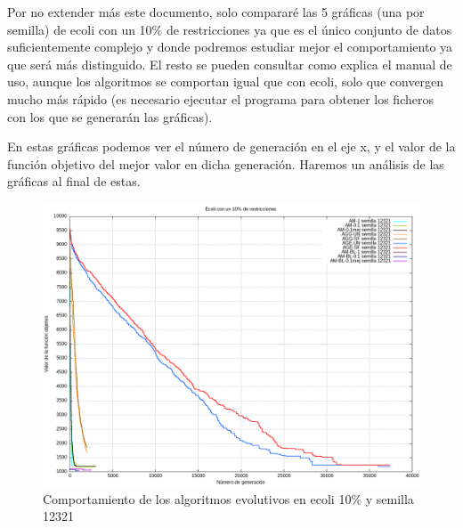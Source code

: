 \documentclass[12pt, spanish]{article}
\begin{document}
Por no extender más este documento, solo compararé las 5 gráficas (una por semilla) de ecoli con un 10\% de restricciones ya que es el único conjunto de datos suficientemente complejo y donde podremos estudiar mejor el comportamiento ya que será más distinguido. El resto se pueden consultar como explica el manual de uso, aunque los algoritmos se comportan igual que con ecoli, solo que convergen mucho más rápido (es necesario ejecutar el programa para obtener los ficheros con los que se generarán las gráficas).

En estas gráficas podemos ver el número de generación en el eje x, y el valor de la función objetivo del mejor valor en dicha generación. Haremos un análisis de las gráficas al final de estas.

\begin{figure}[H]
  \centering
      \includegraphics[scale = 0.50]{ecoli_set_const_10_12321.png}
 		 \caption{Comportamiento de los algoritmos evolutivos en ecoli 10\% y semilla 12321}
  		\label{fig:g-12321}

\end{figure}
\end{document}
